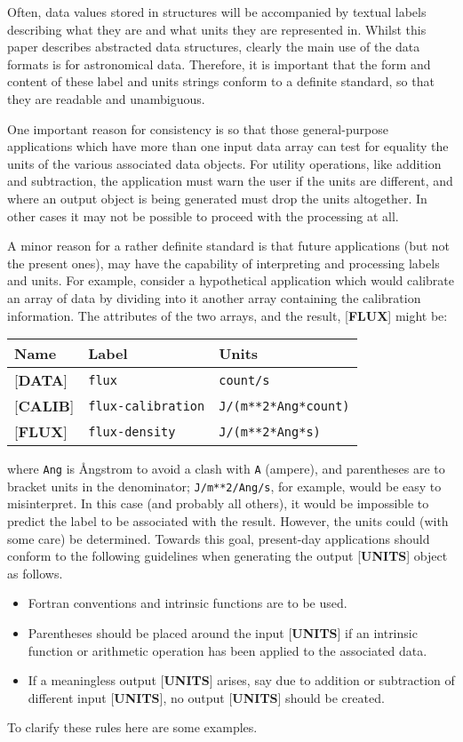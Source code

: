\documentclass[twoside,11pt,nolof,noabs]{starlink}
\begin{document}
Often, data values stored in structures will be accompanied
by textual labels describing what they are and what units they
are represented in.
Whilst this paper describes abstracted data structures, clearly the
main use of the data formats is for astronomical data.  Therefore,
it is important that the form and content of these label and
units strings conform to a definite standard,
so that they are readable and unambiguous.

One important reason for consistency is so
that those general-purpose
applications which have more than one input
data array can test for equality the units of the various associated
data objects. For utility operations, like addition and subtraction,
the application must warn the user if the units are different, and
where an output object is being generated must
drop the units altogether.
In other cases it may not be possible to proceed with
the processing at all.

A minor reason for a rather definite standard is that future
applications (but not the present ones), may
have the capability of interpreting and processing
labels and units.
For example, consider a hypothetical application which
would calibrate an array of data
by dividing into it another
array containing the calibration information.
The attributes of the two arrays, and the result, {[}\textbf{FLUX}{]}
might be:

\begin{center}
\begin{tabular}{lll}
Name & Label & Units \\ \hline
{[}\textbf{DATA}{]} & \texttt{flux} & \texttt{count/s} \\
{[}\textbf{CALIB}{]} & \texttt{flux-calibration} & \texttt{J/(m**2*Ang*count)} \\
{[}\textbf{FLUX}{]} & \texttt{flux-density} & \texttt{J/(m**2*Ang*s)} \\ \hline
\end{tabular}
\end{center}
\medskip

where \texttt{Ang} is \AA ngstrom to avoid a clash with \texttt{A} (ampere),
and parentheses
are to bracket units in the denominator; \texttt{J/m**2/Ang/s},
for example, would be easy to misinterpret.
In this case (and probably all others), it would
be impossible to predict
the label to be associated with the result.
However, the units could (with some care) be determined.
Towards this goal,
present-day
applications should conform to the following guidelines when
generating the output {[}\textbf{UNITS}{]} object as follows.
\begin{itemize}
\item Fortran conventions and intrinsic functions are to be used.
\item Parentheses should be
placed around the input {[}\textbf{UNITS}{]} if an intrinsic
function or arithmetic operation has been applied to the associated data.
\item If a meaningless output {[}\textbf{UNITS}{]} arises, say due to addition or
subtraction of different input
{[}\textbf{UNITS}{]}, no output {[}\textbf{UNITS}{]} should be created.
\end{itemize}
To clarify these rules here are some examples.
\end{document}
